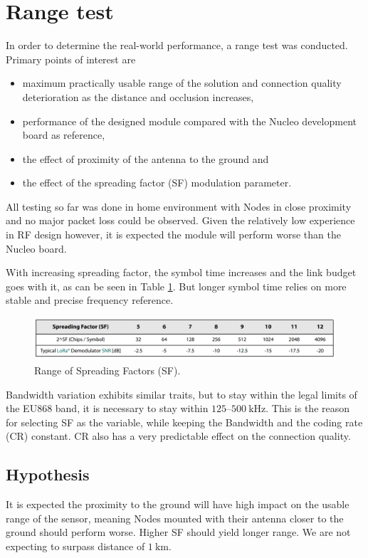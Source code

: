 \section{Range test}
In order to determine the real-world performance, a range test was conducted. Primary points of interest are
\begin{itemize}
    \item maximum practically usable range of the solution and connection quality deterioration as the distance and occlusion increases,
    \item performance of the designed module compared with the Nucleo development board as reference,
    \item the effect of proximity of the antenna to the ground and
    \item the effect of the spreading factor (SF) modulation parameter.
\end{itemize}

All testing so far was done in home environment with Nodes in close proximity and no major packet loss could be observed. Given the relatively low experience in RF design however, it is expected the module will perform worse than the Nucleo board.

With increasing spreading factor, the symbol time increases and the link budget goes with it, as can be seen in Table \ref{table:semtech-sf}. But longer symbol time relies on more stable and precise frequency reference. 

\begin{figure}[H]
    \includegraphics[width=\textwidth]{fig/semtech-sf-table.png}
    \caption{\label{table:semtech-sf}Range of Spreading Factors (SF).}
\end{figure}

Bandwidth variation exhibits similar traits, but to stay within the legal limits of the EU868 band, it is necessary to stay within $125\text{--}500~\mathrm{kHz}$. This is the reason for selecting SF as the variable, while keeping the Bandwidth and the coding rate (CR) constant. CR also has a very predictable effect on the connection quality.

\subsection{Hypothesis}
It is expected the proximity to the ground will have high impact on the usable range of the sensor, meaning Nodes mounted with their antenna closer to the ground should perform worse. Higher SF should yield longer range. We are not expecting to surpass distance of $1~\mathrm{km}$.

